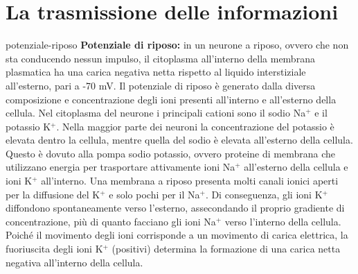 \documentclass[preview]{standalone}
\begin{document}
\genpage

\section{La trasmissione delle informazioni}


\begin{snippet}{potenziale-riposo}
    \textbf{Potenziale di riposo:} in un neurone a riposo, ovvero che non sta conducendo nessun impulso, il citoplasma
all'interno della membrana plasmatica ha una carica negativa netta rispetto al liquido
interstiziale all'esterno, pari a -70 mV. Il potenziale di riposo è generato dalla diversa
composizione e concentrazione degli ioni presenti all'interno e all'esterno della cellula. Nel
citoplasma del neurone i principali cationi sono il sodio Na\({}^+\) e il potassio K\({}^+\). Nella maggior
parte dei neuroni la concentrazione del potassio è elevata dentro la cellula, mentre quella
del sodio è elevata all'esterno della cellula. Questo è dovuto alla pompa sodio potassio,
ovvero proteine di membrana che utilizzano energia per trasportare attivamente ioni Na\({}^+\)
all'esterno della cellula e ioni K\({}^+\) all'interno. Una membrana a riposo presenta molti canali
ionici aperti per la diffusione del K\({}^+\) e solo pochi per il Na\({}^+\). Di conseguenza, gli ioni K\({}^+\)
diffondono spontaneamente verso l'esterno, assecondando il proprio gradiente di
concentrazione, più di quanto facciano gli ioni Na\({}^+\) verso l'interno della cellula. Poiché il
movimento degli ioni corrisponde a un movimento di carica elettrica, la fuoriuscita degli ioni
K\({}^+\) (positivi) determina la formazione di una carica netta negativa all'interno della cellula.
\end{snippet}

\end{document}
